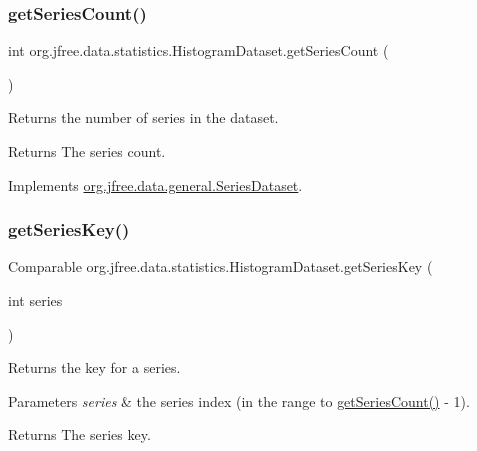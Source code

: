 \subsubsection{\texorpdfstring{get\+Series\+Count()}{getSeriesCount()}}
{\footnotesize\ttfamily int org.\+jfree.\+data.\+statistics.\+Histogram\+Dataset.\+get\+Series\+Count (\begin{DoxyParamCaption}{ }\end{DoxyParamCaption})}

Returns the number of series in the dataset.

\begin{DoxyReturn}{Returns}
The series count. 
\end{DoxyReturn}


Implements \mbox{\hyperlink{interfaceorg_1_1jfree_1_1data_1_1general_1_1_series_dataset_a84fe822f5918f941d9de1ed1b73c9f58}{org.\+jfree.\+data.\+general.\+Series\+Dataset}}.

\mbox{\label{classorg_1_1jfree_1_1data_1_1statistics_1_1_histogram_dataset_a8d2fb8164ead00eaa7a1d09cc70eb803}} 
\subsubsection{\texorpdfstring{get\+Series\+Key()}{getSeriesKey()}}
{\footnotesize\ttfamily Comparable org.\+jfree.\+data.\+statistics.\+Histogram\+Dataset.\+get\+Series\+Key (\begin{DoxyParamCaption}\item[{int}]{series }\end{DoxyParamCaption})}

Returns the key for a series.


\begin{DoxyParams}{Parameters}
{\em series} & the series index (in the range {} to {\ttfamily \mbox{\hyperlink{classorg_1_1jfree_1_1data_1_1statistics_1_1_histogram_dataset_a6dd14ceca0cb3f9b3d666a2aec480f8d}{get\+Series\+Count()}} -\/ 1}).\\
\hline
\end{DoxyParams}
\begin{DoxyReturn}{Returns}
The series key.
\end{DoxyReturn}

